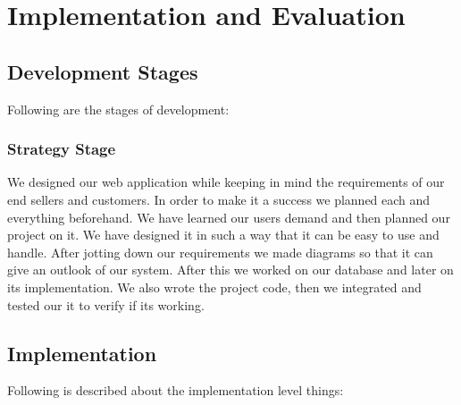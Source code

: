 
\chapter{Implementation and Evaluation} %

\label{Chapter4} %


\section{Development Stages }
Following are the stages of development:
\subsection{Strategy Stage}
We designed our web application while keeping in mind the requirements of our end sellers and customers. In order to make it a success we planned each and everything beforehand. We have learned our users demand and then planned our project on it. We have designed it in such a way that it can be easy to use and handle. After jotting down our requirements we made diagrams so that it can give an outlook of our system. After this we worked on our database and later on its implementation. We also wrote the project code, then we integrated and tested our it to verify if its working.

\section{Implementation}
Following is described about the implementation level things:

